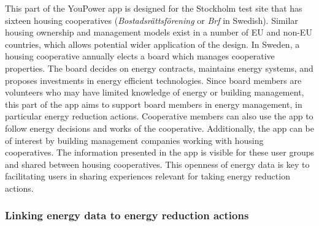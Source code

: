 This part of the YouPower app is designed for the Stockholm test site that has sixteen housing cooperatives (\textit{Bostadsr{\"a}ttsf{\"o}rening} or \textit{Brf} in Swedish).
Similar housing ownership and management models exist in a number of EU and non-EU countries, which allows potential wider application of the design.
In Sweden, a housing cooperative annually elects a board which manages cooperative properties. 
%
The board decides on energy contracts, maintains energy systems, and proposes investments in energy efficient technologies. Since board members are volunteers who may have limited knowledge of energy or building management, this part of the app aims to support board members in energy management, in particular energy reduction actions. Cooperative members can also use the app to follow energy decisions and works of the cooperative. Additionally, the app can be of interest by building management companies working with housing cooperatives. 
The information presented in the app is visible for these user
groups and shared between housing cooperatives. This openness of energy data is key to
facilitating  users in sharing experiences relevant for taking energy reduction actions.

\subsubsection{Linking energy data to energy reduction actions}

